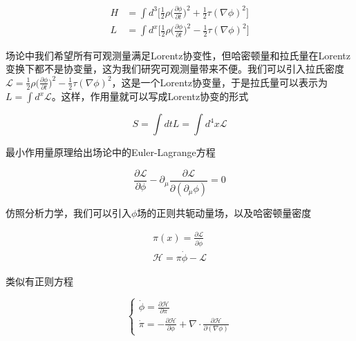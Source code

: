 \begin{equation}
    \begin{split}
        H &= \int d^3\bigl[\frac{1}{2}\rho\bigl(\frac{\partial\phi}{\partial t}\bigr)^2+\frac{1}{2}\tau(\nabla\phi)^2\bigr] \\
        L &= \int d^x\bigl[\frac{1}{2}\rho\bigl(\frac{\partial\phi}{\partial t}\bigr)^2-\frac{1}{2}\tau(\nabla\phi)^2\bigr]
    \end{split}
\end{equation}

场论中我们希望所有可观测量满足Lorentz协变性，但哈密顿量和拉氏量在Lorentz变换下都不是协变量，这为我们研究可观测量带来不便。我们可以引入拉氏密度$\mathcal{L}=\frac{1}{2}\rho\bigl(\frac{\partial\phi}{\partial t}\bigr)^2-\frac{1}{2}\tau(\nabla\phi)^2$，这是一个Lorentz协变量，于是拉氏量可以表示为$L=\int d^x \mathcal{L}$。这样，作用量就可以写成Lorentz协变的形式

\begin{equation}
    S=\int dtL=\int d^4x\mathcal{L}
\end{equation}

最小作用量原理给出场论中的Euler-Lagrange方程

\begin{equation}
    \frac{\partial\mathcal{L}}{\partial\phi}-\partial_\mu\frac{\partial\mathcal{L}}{\partial(\partial_\mu\phi)}=0
\end{equation}

仿照分析力学，我们可以引入$\phi$场的正则共轭动量场，以及哈密顿量密度

\begin{equation}
    \begin{split}
        \pi(x)=\frac{\partial\mathcal{L}}{\partial\dot{\phi}} \\
        \mathcal{H}=\pi\dot{\phi}-\mathcal{L}
    \end{split}
\end{equation}

类似有正则方程

\begin{equation}
    \left\{
        \begin{array}{lr}
            \dot{\phi}=\frac{\partial\mathcal{H}}{\partial\pi} \\
            \dot{\pi}=-\frac{\partial\mathcal{H}}{\partial\phi}+\nabla\cdot\frac{\partial\mathcal{H}}{\partial(\nabla\phi)}
        \end{array}
    \right.
\end{equation}



